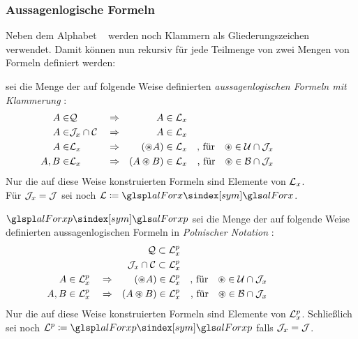 \subsubsection{Aussagenlogische Formeln}%
\label{subsub:Formeln}

Neben dem Alphabet \objqt{\alABC} \textbzw\ \objqt{\alABCx} werden noch Klammern als Gliederungszeichen verwendet.
Damit können nun rekursiv für jede Teilmenge \objqt{\alJunx} von \objqt{\alJun} zwei Mengen von Formeln definiert werden:

 sei die Menge der auf folgende Weise definierten \emph{aussagenlogischen Formeln mit Klammerung}%
:
\begin{align}
	A    \in & \mathcal{Q}               && \Rightarrow &           A  \in \mathcal{L}_x
	\\
	A    \in & \mathcal{J}_x \cap \mathcal{C}  && \Rightarrow &           A  \in \mathcal{L}_x
	\\
	A    \in & \mathcal{L}_x              && \Rightarrow &   (\circledast A) \in \mathcal{L}_x
	& & \text{, für} \quad \circledast \in \mathcal{U} \cap \mathcal{J}_x
	\\
	A, B \in & \mathcal{L}_x              && \Rightarrow & (A \circledast B) \in \mathcal{L}_x
	& & \text{, für} \quad \circledast \in \mathcal{B} \cap \mathcal{J}_x
	&&&&&&&&&&
\end{align}
Nur die auf diese Weise konstruierten Formeln sind Elemente von $\mathcal{L}_x$.
\\Für $\mathcal{J}_x = \mathcal{J}$ sei noch $\alFor \defeq \glsSym{alForx}$.

$\glsSym{alForxp}$ sei die Menge der auf folgende Weise definierten aussagenlogischen Formeln in \emph{Polnischer Notation}%
:
\begin{align}
	&                                  & \mathcal{Q}              \subset \mathcal{L}_x^p
	\\
	&                                  & \mathcal{J}_x \cap \mathcal{C} \subset \mathcal{L}_x^p
	\\
	A    \in \mathcal{L}_x^p & \quad \Rightarrow &  (\circledast A)         \in     \mathcal{L}_x^p
	& & \text{, für}  \quad \circledast \in \mathcal{U} \cap \mathcal{J}_x
	\\
	A, B \in \mathcal{L}_x^p & \quad \Rightarrow & (A \circledast B)        \in     \mathcal{L}_x^p
	& & \text{, für}  \quad \circledast \in \mathcal{B} \cap \mathcal{J}_x
	&&&&&&&&&&
\end{align}
Nur die auf diese Weise konstruierten Formeln sind Elemente von $\mathcal{L}_x^p$.
Schließlich sei noch $\alForp \defeq \glsSym{alForxp}$ falls $\mathcal{J}_x = \mathcal{J}$.

